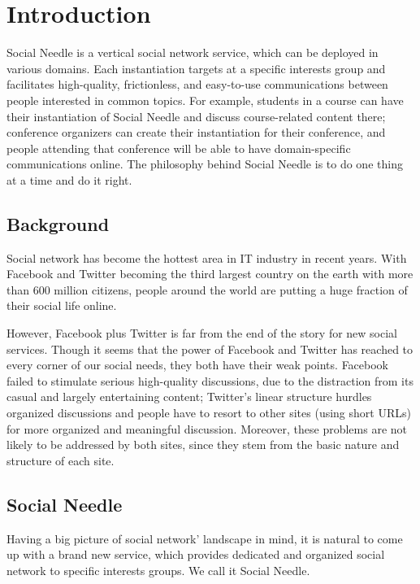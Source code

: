 
%
%

\chapter{Introduction}
Social Needle is a vertical social network service, which can be deployed in various domains. Each instantiation targets at a specific interests group and facilitates high-quality, frictionless, and easy-to-use communications between people interested in common topics. For example, students in a course can have their instantiation of Social Needle and discuss course-related content there; conference organizers can create their instantiation for their conference, and people attending that conference will be able to have domain-specific communications online. The philosophy behind Social Needle is to do one thing at a time and do it right. 

\section{Background}
Social network has become the hottest area in IT industry in recent years. With Facebook and Twitter becoming the third largest country on the earth with more than 600 million citizens, people around the world are putting a huge fraction of their social life online. 

However, Facebook plus Twitter is far from the end of the story for new social services. Though it seems that the power of Facebook and Twitter has reached to every corner of our social needs, they both have their weak points. Facebook failed to stimulate serious high-quality discussions, due to the distraction from its casual and largely entertaining content; Twitter's linear structure hurdles organized discussions and people have to resort to other sites (using short URLs) for more organized and meaningful discussion. Moreover, these problems are not likely to be addressed by both sites, since they stem from the basic nature and structure of each site.

\section{Social Needle}
Having a big picture of social network' landscape in mind, it is natural to come up with a brand new service, which provides dedicated and organized social network to specific interests groups. We call it Social Needle. 


